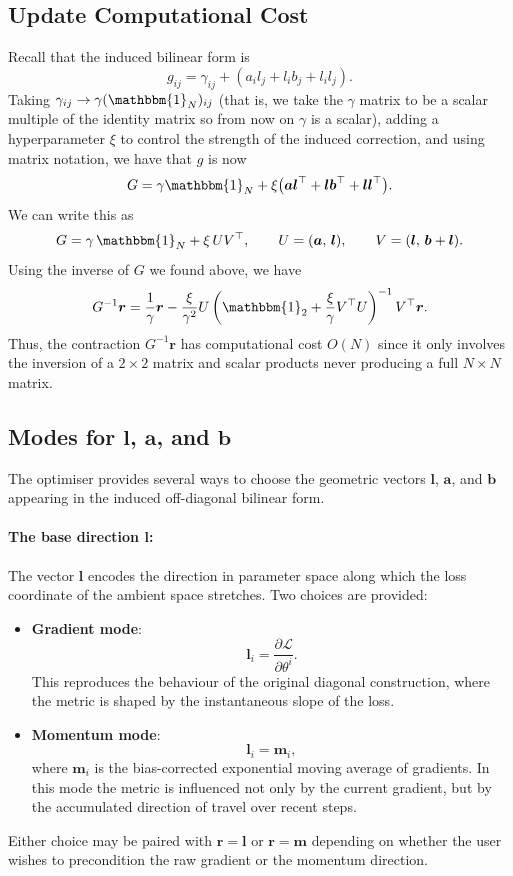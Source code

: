 \documentclass{article}
\newcommand{\loss}{\mathcal{L}}
\newcommand{\Id}{\mathbbm{1}}
\newcommand{\vecb}[1]{\boldsymbol{#1}}
\begin{document}
\subsection*{Update Computational Cost}
Recall that the induced bilinear form is $$
    g_{ij}
    = \gamma_{ij}
      + \left(a_i l_j + l_i b_j + l_i l_j\right).
$$ Taking $\gamma_{ij}\to\gamma(\Id_N)_{ij}$
(that is, we take the $\gamma$ matrix to be a scalar multiple of the identity matrix so from now on $\gamma$ is a scalar), 
adding a hyperparameter $\xi$ to control the strength of the induced correction, and using matrix notation, we have that $g$ is now $$
    G = \gamma\Id_N + \xi\bigl(\vecb{a}\vecb{l}^\top + \vecb{l}\vecb{b}^\top + \vecb{l}\vecb{l}^\top\bigr).
$$ We can write this as $$
    G = \gamma\,\Id_N + \xi\,U V^\top,
    \qquad U = (\vecb{a},\, \vecb{l}),
    \qquad V = (\vecb{l},\, \vecb{b} + \vecb{l}).
$$ Using the inverse of $G$ we found above, we have $$
    G^{-1} \vecb{r}
    = \frac{1}{\gamma} \vecb{r} - \frac{\xi}{\gamma^2} U \left(\Id_2 + \frac{\xi}{\gamma} V^\top U\right)^{-1} V^\top \vecb{r}.
$$ Thus, the contraction $G^{-1} \vecb{r}$ has computational cost $O(N)$ 
since it only involves the inversion of a $2\times 2$ matrix 
and scalar products never producing a full $N\times N$ matrix.

\subsection*{Modes for $\vecb{l}$, $\vecb{a}$, and $\vecb{b}$}
The optimiser provides several ways to choose the geometric vectors
$\vecb{l}$, $\vecb{a}$, and $\vecb{b}$ appearing in the induced off-diagonal bilinear form.

\paragraph{The base direction $\vecb{l}$:}
The vector $\vecb{l}$ encodes the direction in parameter space along which the loss coordinate of the ambient space stretches.
Two choices are provided:
\begin{itemize}
    \item \textbf{Gradient mode}: $$
        \vecb{l}_i = \frac{\partial \loss}{\partial \theta^i}.
    $$ This reproduces the behaviour of the original diagonal construction,
    where the metric is shaped by the instantaneous slope of the loss.

    \item \textbf{Momentum mode}: $$
        \vecb{l}_i = \vecb{m}_i,
    $$ where $\vecb{m}_i$ is the bias-corrected exponential moving average of gradients.
    In this mode the metric is influenced not only by the current gradient,
    but by the accumulated direction of travel over recent steps.
\end{itemize}
Either choice may be paired with $\vecb{r}=\vecb{l}$ or $\vecb{r}=\vecb{m}$ depending on
whether the user wishes to precondition the raw gradient or the
momentum direction.
\end{document}
